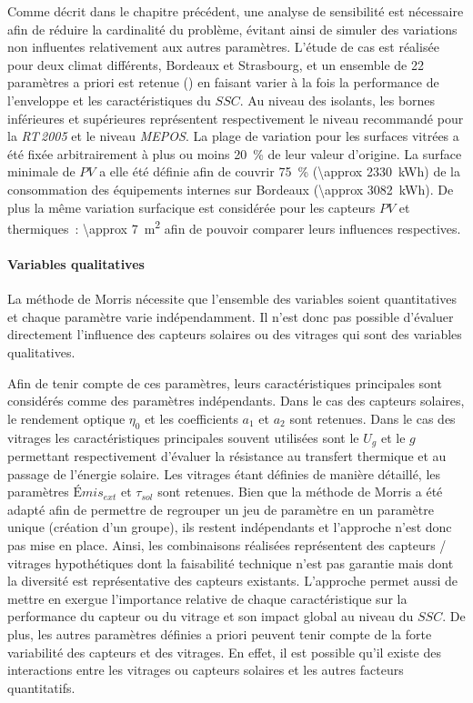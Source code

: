 Comme décrit dans le chapitre précédent, une analyse de sensibilité est nécessaire
afin de réduire la cardinalité du problème, évitant ainsi de simuler des variations
non influentes relativement aux autres paramètres.
L’étude de cas est réalisée pour deux climat différents, Bordeaux et Strasbourg,
et un ensemble de \num{22} paramètres a priori est retenue ()
en faisant varier à la fois la performance de l’enveloppe et les caractéristiques du $SSC$.
Au niveau des isolants, les bornes inférieures et supérieures représentent respectivement
le niveau recommandé pour la \textit{RT\,2005} et le niveau \textit{MEPOS}.
La plage de variation pour les surfaces vitrées a été fixée arbitrairement à plus ou moins \SI{20}{\percent}
de leur valeur d’origine.
La surface minimale de $PV$ a elle été définie afin de couvrir \SI{75}{\percent} (\SI{\approx
2330}{\kWh}) de la consommation des équipements internes sur Bordeaux (\SI{\approx 3082}{\kWh}).
De plus la même variation surfacique est considérée pour les capteurs $PV$ et
thermiques~: \SI{\approx 7}{\metre\squared} afin de pouvoir comparer leurs influences respectives.


\paragraph{Variables qualitatives} %
\label{par:variables_qualitatives}
La méthode de Morris nécessite que l’ensemble des variables soient quantitatives et chaque
paramètre varie indépendamment. Il n’est donc pas possible d’évaluer directement
l’influence des capteurs solaires ou des vitrages qui sont des variables qualitatives.

Afin de tenir compte de ces paramètres, leurs caractéristiques principales sont considérés
comme des paramètres indépendants. Dans le cas des capteurs solaires, le rendement optique
$\eta_{0}$ et les coefficients $a_{1}$ et $a_{2}$ sont retenues. Dans le cas des vitrages
les caractéristiques principales souvent utilisées sont le $U_{g}$ et le $g$ permettant
respectivement d’évaluer la résistance au transfert thermique et au passage de l’énergie
solaire. Les vitrages étant définies de manière détaillé, les paramètres $Émis_{ext}$
et $\tau_{sol}$ sont retenues. Bien que la méthode de Morris a été adapté afin de permettre de
regrouper un jeu de paramètre en un paramètre unique (création d’un groupe), ils restent
indépendants et l’approche n’est donc pas mise en place. Ainsi, les combinaisons réalisées
représentent des capteurs / vitrages hypothétiques dont la faisabilité technique n’est pas
garantie mais dont la diversité est représentative des capteurs existants. L’approche permet
aussi de mettre en exergue l’importance relative de chaque
caractéristique sur la performance du capteur ou du vitrage et son impact global au niveau
du $SSC$. De plus, les autres paramètres définies a priori peuvent tenir compte de la
forte variabilité des capteurs et des vitrages. En effet, il est possible qu’il existe des
interactions entre les vitrages ou capteurs solaires et les autres facteurs quantitatifs.

